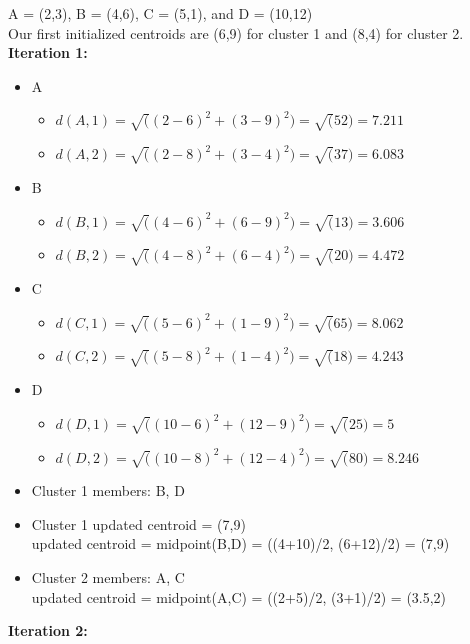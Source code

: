 \documentclass[12pt]{article}
\begin{document}
\begin{enumerate}
\begin{enumerate}
A = (2,3), B = (4,6), C = (5,1), and D = (10,12) \\ 
Our first initialized centroids are (6,9) for cluster 1 and (8,4) for cluster 2. \\


\textbf{Iteration 1: }\\ 

\begin{itemize}
\item A
  \begin{itemize}
    \item $d(A,1) = \sqrt((2-6)^2 + (3-9)^2) = \sqrt(52) = 7.211$ 
    \item $d(A,2) = \sqrt((2-8)^2 + (3-4)^2) = \sqrt(37) = 6.083$
  \end{itemize}

\item B 
  \begin{itemize}
    \item $d(B,1) = \sqrt((4-6)^2 + (6-9)^2) = \sqrt(13) = 3.606$
    \item $d(B,2) = \sqrt((4-8)^2 + (6-4)^2) = \sqrt(20) = 4.472$
  \end{itemize}
\item C
  \begin{itemize}
    \item $d(C,1) = \sqrt((5-6)^2 + (1-9)^2) = \sqrt(65) = 8.062$
    \item $d(C,2) = \sqrt((5-8)^2 + (1-4)^2) = \sqrt(18) = 4.243$
  \end{itemize}
\item D
  \begin{itemize}
    \item $d(D,1) = \sqrt((10-6)^2 + (12-9)^2) = \sqrt(25) = 5$
    \item $d(D,2) = \sqrt((10-8)^2 + (12-4)^2) = \sqrt(80) = 8.246$
  \end{itemize}
\item Cluster 1 members: B, D
\item Cluster 1 updated centroid = (7,9) \\ 
  updated centroid = midpoint(B,D) = ((4+10)/2, (6+12)/2) = (7,9)
\item Cluster 2 members: A, C \\ 
  updated centroid = midpoint(A,C) = ((2+5)/2, (3+1)/2) = (3.5,2) 
\end{itemize}

\textbf{Iteration 2: } \\ 


\end{enumerate}
\end{enumerate}
\end{document}
